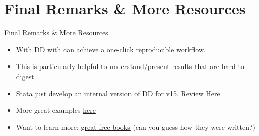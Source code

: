 \documentclass[ignorenonframetext,]{beamer}
\providecommand{\tightlist}{%
\setlength{\itemsep}{0pt}\setlength{\parskip}{0pt}}
\begin{document}
\section{Final Remarks \& More
Resources}\label{final-remarks-more-resources}

\begin{frame}{Final Remarks \& More Resources}

\begin{itemize}
\tightlist
\item
  With DD with can achieve a one-click reproducible workflow.
\item
  This is particularly helpful to understand/present results that are
  hard to digest.
\item
  Stata just develop an internal version of DD for v15.
  \href{https://www.bitss.org/2017/09/05/review-of-statas-dyndoc/}{Review
  Here}
\item
  More great examples \href{}{here}
\item
  Want to learn more: \href{https://bookdown.org/}{great free books}
  (can you guess how they were written?)
\end{itemize}

\end{frame}
\end{document}
